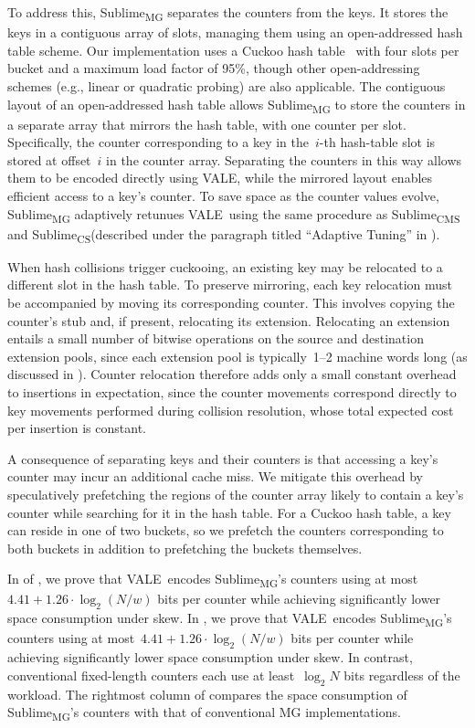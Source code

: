 \documentclass[sigconf]{acmart}
\newcommand{\sketch}{Sublime}
\newcommand{\sketchcms}{\sketch\textsubscript{CMS}\xspace}
\newcommand{\sketchcs}{\sketch\textsubscript{CS}\xspace}
\newcommand{\sketchmg}{\sketch\textsubscript{MG}\xspace}
\newcommand{\counterencodingabbrv}{VALE}
\begin{document}
To address this, \sketchmg separates the counters from the keys.
It stores the keys in a contiguous array of slots, managing them using an open-addressed hash table scheme.
Our implementation uses a Cuckoo hash table~\cite{CuckooHashing,CuckooHashingConference} with four slots per bucket and a maximum load factor of 95\%, though other open-addressing schemes (e.g., linear or quadratic probing) are also applicable.
The contiguous layout of an open-addressed hash table allows \sketchmg to store the counters in a separate array that mirrors the hash table, with one counter per slot.
Specifically, the counter corresponding to a key in the~$i${\nobreakdash-}th hash-table slot is stored at offset~$i$ in the counter array.
Separating the counters in this way allows them to be encoded directly using \counterencodingabbrv, while the mirrored layout enables efficient access to a key's counter.
To save space as the counter values evolve, \sketchmg adaptively retunues \counterencodingabbrv\ using the same procedure as \sketchcms and \sketchcs (described under the paragraph titled ``Adaptive Tuning'' in ).

When hash collisions trigger cuckooing, an existing key may be relocated to a different slot in the hash table.
To preserve mirroring, each key relocation must be accompanied by moving its corresponding counter.
This involves copying the counter's stub and, if present, relocating its extension.
Relocating an extension entails a small number of bitwise operations on the source and destination extension pools, since each extension pool is typically~1--2 machine words long (as discussed in ).
Counter relocation therefore adds only a small constant overhead to insertions in expectation, since the counter movements correspond directly to key movements performed during collision resolution, whose total expected cost per insertion is constant.

A consequence of separating keys and their counters is that accessing a key's counter may incur an additional cache miss.
We mitigate this overhead by speculatively prefetching the regions of the counter array likely to contain a key's counter while searching for it in the hash table.
For a Cuckoo hash table, a key can reside in one of two buckets, so we prefetch the counters corresponding to both buckets in addition to prefetching the buckets themselves.

\iftods
In  of , we prove that \counterencodingabbrv\ encodes \sketchmg's counters using at most~$4.41 + 1.26 \cdot \log_2 (N/w)$ bits per counter while achieving significantly lower space consumption under skew.
\else
In , we prove that \counterencodingabbrv\ encodes \sketchmg's counters using at most~$4.41 + 1.26 \cdot \log_2 (N/w)$ bits per counter while achieving significantly lower space consumption under skew.
\fi
In contrast, conventional fixed-length counters each use at least~$\log_2 N$ bits regardless of the workload.
The rightmost column of  compares the space consumption of \sketchmg's counters with that of conventional MG implementations.
\end{document}
